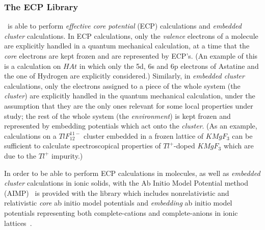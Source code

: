 





\subsubsection{The ECP Library}
\label{UG:sec:the_ecp_libraries}

\molcas\ is able to perform {\it effective core potential} (ECP) calculations
and {\it embedded cluster} calculations.
In ECP calculations, only the {\it valence} electrons of a molecule are
explicitly handled in a quantum mechanical calculation,
at a time that the {\it core} electrons are kept frozen and are represented by
ECP's.
(An example of this is a calculation on $HAt$ in which only the 5d, 6s and 6p
electrons of Astatine  and the one of Hydrogen  are explicitly considered.)
Similarly, in {\it embedded cluster} calculations,
only the electrons assigned to a piece of the whole system (the {\it cluster})
are explicitly handled in the quantum mechanical calculation,
under the assumption that they are the only ones relevant for
some local properties under study;
the rest of the whole system (the {\it environment})
is kept frozen and represented by embedding potentials
which act onto the {\it cluster}.
(As an example, calculations on a $TlF_{12}^{11-}$ cluster embedded in
a frozen lattice of $KMgF_3$ can be sufficient to calculate spectroscopical
properties of $Tl^{+}$-doped $KMgF_3$ which are due to the $Tl^{+}$
impurity.)

In order to be able to perform ECP calculations in molecules, as well as
{\it embedded cluster} calculations in ionic solids, with the
Ab Initio Model Potential method
(AIMP) \cite{Huzinaga:87,Barandiaran:88,Barandiaran:90,Wittborn:95,Rakowitz:99a,Rakowitz:99b}
\molcas\ is provided with the library
 which includes nonrelativistic and relativistic
{\it core} ab initio model potentials and
{\em embedding} ab initio model potentials
representing both complete-cations and complete-anions in ionic
lattices~\cite{Barandiaran:88,Barandiaran:92}.

